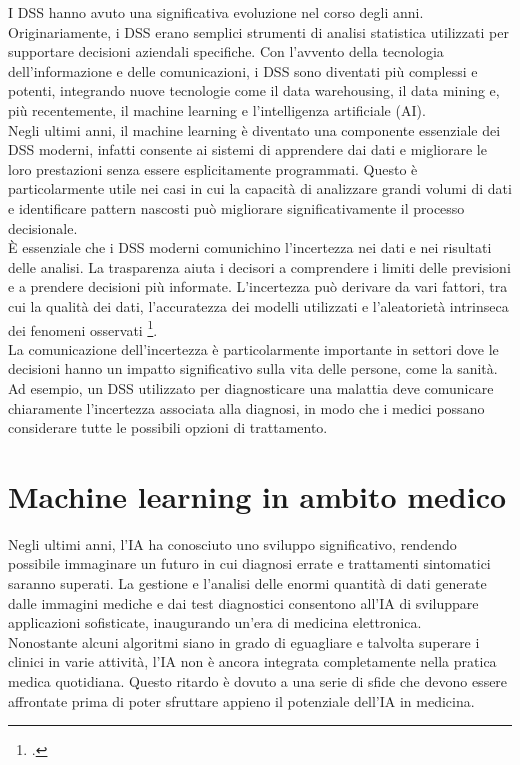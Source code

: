 I DSS hanno avuto una significativa evoluzione nel corso degli anni. Originariamente, i DSS erano semplici strumenti di analisi statistica utilizzati per supportare decisioni aziendali specifiche. Con l'avvento della tecnologia dell'informazione e delle comunicazioni, i DSS sono diventati più complessi e potenti, integrando nuove tecnologie come il data warehousing, il data mining e, più recentemente, il machine learning e l'intelligenza artificiale (AI).\\
Negli ultimi anni, il machine learning è diventato una componente essenziale dei DSS moderni, infatti consente ai sistemi di apprendere dai dati e migliorare le loro prestazioni senza essere esplicitamente programmati. Questo è particolarmente utile nei casi in cui la capacità di analizzare grandi volumi di dati e identificare pattern nascosti può migliorare significativamente il processo decisionale.\\
È essenziale che i DSS moderni comunichino l'incertezza nei dati e nei risultati delle analisi. La trasparenza aiuta i decisori a comprendere i limiti delle previsioni e a prendere decisioni più informate. L'incertezza può derivare da vari fattori, tra cui la qualità dei dati, l'accuratezza dei modelli utilizzati e l'aleatorietà intrinseca dei fenomeni osservati \footcite{womak:role-decision-making}.\\
La comunicazione dell'incertezza è particolarmente importante in settori dove le decisioni hanno un impatto significativo sulla vita delle persone, come la sanità. Ad esempio, un DSS utilizzato per diagnosticare una malattia deve comunicare chiaramente l'incertezza associata alla diagnosi, in modo che i medici possano considerare tutte le possibili opzioni di trattamento.\\


\section{Machine learning in ambito medico }

Negli ultimi anni, l'IA ha conosciuto uno sviluppo significativo, rendendo possibile immaginare un futuro in cui diagnosi errate e trattamenti sintomatici saranno superati. La gestione e l'analisi delle enormi quantità di dati generate dalle immagini mediche e dai test diagnostici consentono all'IA di sviluppare applicazioni sofisticate, inaugurando un'era di medicina elettronica.\\
Nonostante alcuni algoritmi siano in grado di eguagliare e talvolta superare i clinici in varie attività, l'IA non è ancora integrata completamente nella pratica medica quotidiana. Questo ritardo è dovuto a una serie di sfide che devono essere affrontate prima di poter sfruttare appieno il potenziale dell'IA in medicina.\\

